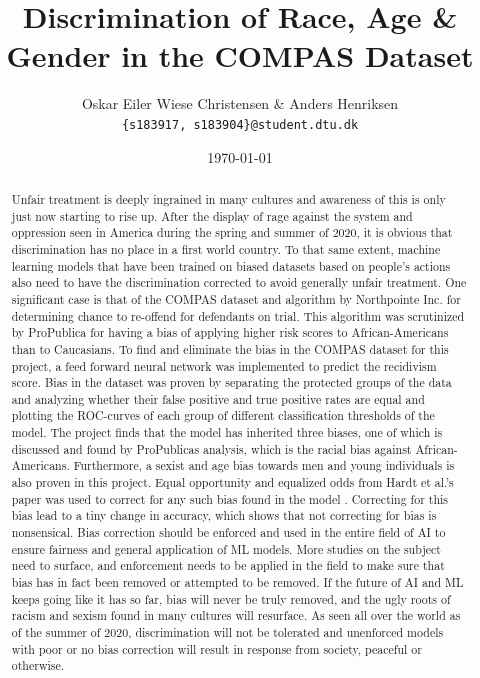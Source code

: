 \documentclass[11pt, fleqn, titlepage]{article}
\title{	Discrimination of Race, Age \& Gender in the COMPAS Dataset}
\author{Oskar Eiler Wiese Christensen \& Anders Henriksen \\ \texttt{\{s183917, s183904\}@student.dtu.dk}}
\date{\today}
\begin{document}
	
	\maketitle
	\begin{abstract}
	\small
	\noindent
	Unfair treatment is deeply ingrained in many cultures and awareness of this is only just now starting to rise up. After the display of rage against the system and oppression seen in America during the spring and summer of 2020, it is obvious that discrimination has no place in a first world country. To that same extent, machine learning models that have been trained on biased datasets based on people's actions also need to have the discrimination corrected to avoid generally unfair treatment. One significant case is that of the COMPAS dataset and algorithm by Northpointe Inc. for determining chance to re-offend for defendants on trial. This algorithm was scrutinized by ProPublica for having a bias of applying higher risk scores to African-Americans than to Caucasians. To find and eliminate the bias in the COMPAS dataset for this project, a feed forward neural network was implemented to predict the recidivism score. Bias in the dataset was proven by separating the protected groups of the data and analyzing whether their false positive and true positive rates are equal and plotting the ROC-curves of each group of different classification thresholds of the model. The project finds that the model has inherited three biases, one of which is discussed and found by ProPublicas analysis, which is the racial bias against African-Americans. Furthermore, a sexist and age bias towards men and young individuals is also proven in this project. Equal opportunity and equalized odds from Hardt et al.'s paper was used to correct for any such bias found in the model \cite{equal_of_oppor}. Correcting for this bias lead to a tiny change in accuracy, which shows that not correcting for bias is nonsensical. Bias correction should be enforced and used in the entire field of AI to ensure fairness and general application of ML models. More studies on the subject need to surface, and enforcement needs to be applied in the field to make sure that bias has in fact been removed or attempted to be removed. If the future of AI and ML keeps going like it has so far, bias will never be truly removed, and the ugly roots of racism and sexism found in many cultures will resurface. As seen all over the world as of the summer of 2020, discrimination will not be tolerated and unenforced models with poor or no bias correction will result in response from society, peaceful or otherwise.
	

\end{abstract}
\end{document}
